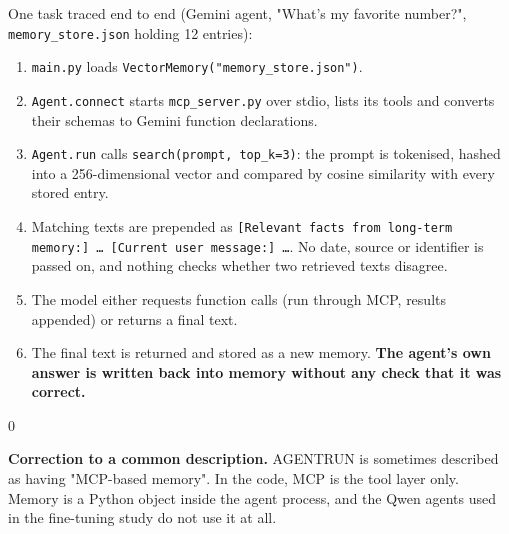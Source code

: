 \documentclass[10.5pt,a4paper,oneside]{report}
\newenvironment{callout}{\par\smallskip\noindent\begin{lrbox}{0}\begin{minipage}{\dimexpr\linewidth-1.6em\relax}}%
  {\end{minipage}\end{lrbox}\colorbox{calloutbg}{\hspace{0.3em}\usebox{0}\hspace{0.3em}}\par\smallskip}
\begin{document}
One task traced end to end (Gemini agent, "What's my favorite number?", \texttt{memory\_\allowbreak{}store.\allowbreak{}json} holding 12 entries):

\begin{enumerate}
\item \texttt{main.\allowbreak{}py} loads \texttt{VectorMemory("memory\_\allowbreak{}store.\allowbreak{}json")}.
\item \texttt{Agent.\allowbreak{}connect} starts \texttt{mcp\_\allowbreak{}server.\allowbreak{}py} over stdio, lists its tools and converts their schemas to Gemini function declarations.
\item \texttt{Agent.\allowbreak{}run} calls \texttt{search(prompt, top\_\allowbreak{}k=3)}: the prompt is tokenised, hashed into a 256-dimensional vector and compared by cosine similarity with every stored entry.
\item Matching texts are prepended as \texttt{[Relevant facts from long-term memory:] … [Current user message:] …}. No date, source or identifier is passed on, and nothing checks whether two retrieved texts disagree.
\item The model either requests function calls (run through MCP, results appended) or returns a final text.
\item The final text is returned and stored as a new memory. \textbf{The agent's own answer is written back into memory without any check that it was correct.}
\end{enumerate}
\begin{callout}\textbf{Correction to a common description.} AGENTRUN is sometimes described as having "MCP-based memory". In the code, MCP is the tool layer only. Memory is a Python object inside the agent process, and the Qwen agents used in the fine-tuning study do not use it at all.\end{callout}
\end{document}
